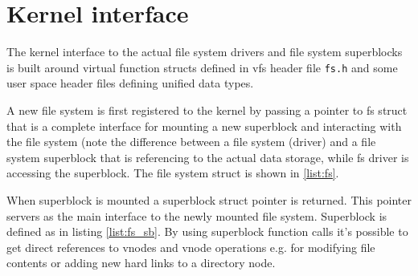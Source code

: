 \section{Kernel interface}

The kernel interface to the actual file system drivers and file system
superblocks is built around virtual function structs defined in \acs{vfs} header
file \verb+fs.h+ and some user space header files defining unified data types.

A new file system is first registered to the kernel by passing a pointer to
fs struct that is a complete interface for mounting a new superblock and
interacting with the file system (note the difference between a file system
(driver) and a file system superblock that is referencing to the actual data
storage, while fs driver is accessing the superblock. The file system struct
is shown in \ref{list:fs}.

When superblock is mounted a superblock struct pointer is returned. This pointer
servers as the main interface to the newly mounted file system. Superblock is
defined as in listing \ref{list:fs_sb}. By using superblock function calls it's
possible to get direct references to vnodes and \acs{vnode} operations e.g. for
modifying file contents or adding new hard links to a directory node.









